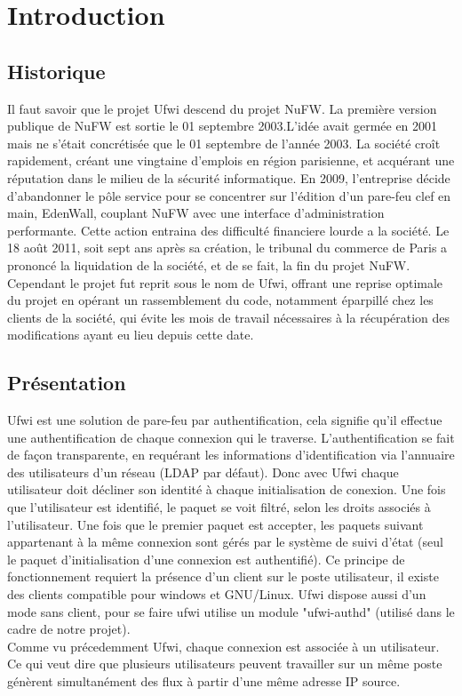\documentclass[12pt]{report}
\begin{document}
\newpage

\chapter{Introduction}
\section{Historique}
Il faut savoir que le projet Ufwi descend du projet NuFW.
La première version publique de NuFW est sortie le 01 septembre 2003.L’idée avait germée en 2001 mais ne s’était concrétisée que le 01 septembre de l’année 2003.
La société croît rapidement, créant une vingtaine d'emplois en région parisienne, et acquérant une réputation dans le milieu de la sécurité informatique. 
En 2009, l'entreprise décide d'abandonner le pôle service pour se concentrer sur l'édition d'un pare-feu clef en main, EdenWall, couplant NuFW avec une interface d'administration performante.
Cette action entraina des difficulté financiere lourde a la société.
Le 18 août 2011, soit sept ans après sa création, le tribunal du commerce de Paris a prononcé la liquidation de la société, et de se fait, la fin du projet NuFW.\\
Cependant le projet fut reprit sous le nom de Ufwi, offrant une reprise optimale du projet en opérant un rassemblement du code,
 notamment éparpillé chez les clients de la société, qui évite les mois de travail nécessaires à la récupération des modifications ayant eu lieu depuis cette date.
\section{Présentation}
Ufwi est une solution de pare-feu par authentification, cela signifie qu'il effectue une authentification de chaque connexion qui le traverse.
 L'authentification se fait de façon transparente, en requérant les informations d’identification via l'annuaire des utilisateurs d'un réseau (LDAP par défaut).
 Donc avec Ufwi chaque utilisateur doit décliner son identité à chaque initialisation de conexion. Une fois que l'utilisateur est identifié,
 le paquet se voit filtré, selon les droits associés à l'utilisateur.
 Une fois que le premier paquet est accepter, les paquets suivant appartenant à la même connexion sont gérés par le système de suivi d'état
 (seul le paquet d'initialisation d'une connexion est authentifié). Ce principe de fonctionnement requiert la présence d'un client sur le poste utilisateur, il existe des clients compatible pour windows et GNU/Linux.
Ufwi dispose aussi d'un mode sans client, pour se faire ufwi utilise un module "ufwi-authd" (utilisé dans le cadre de notre projet).\\
Comme vu précedemment Ufwi, chaque connexion est associée à un utilisateur. Ce qui veut dire que plusieurs utilisateurs peuvent travailler sur un même poste génèrent simultanément des flux à partir d'une même adresse IP source.
\end{document}
